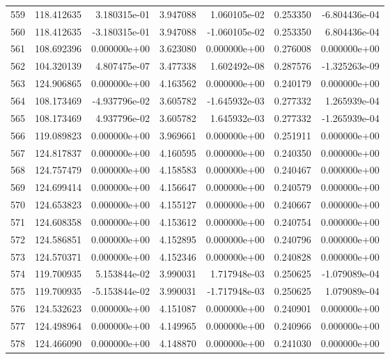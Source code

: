 \begin{tabular}{rrrrrrr}
 559 & 118.412635 &  3.180315e-01 &  3.947088 &  1.060105e-02 &    0.253350 & -6.804436e-04 \\
 560 & 118.412635 & -3.180315e-01 &  3.947088 & -1.060105e-02 &    0.253350 &  6.804436e-04 \\
 561 & 108.692396 &  0.000000e+00 &  3.623080 &  0.000000e+00 &    0.276008 &  0.000000e+00 \\
 562 & 104.320139 &  4.807475e-07 &  3.477338 &  1.602492e-08 &    0.287576 & -1.325263e-09 \\
 563 & 124.906865 &  0.000000e+00 &  4.163562 &  0.000000e+00 &    0.240179 &  0.000000e+00 \\
 564 & 108.173469 & -4.937796e-02 &  3.605782 & -1.645932e-03 &    0.277332 &  1.265939e-04 \\
 565 & 108.173469 &  4.937796e-02 &  3.605782 &  1.645932e-03 &    0.277332 & -1.265939e-04 \\
 566 & 119.089823 &  0.000000e+00 &  3.969661 &  0.000000e+00 &    0.251911 &  0.000000e+00 \\
 567 & 124.817837 &  0.000000e+00 &  4.160595 &  0.000000e+00 &    0.240350 &  0.000000e+00 \\
 568 & 124.757479 &  0.000000e+00 &  4.158583 &  0.000000e+00 &    0.240467 &  0.000000e+00 \\
 569 & 124.699414 &  0.000000e+00 &  4.156647 &  0.000000e+00 &    0.240579 &  0.000000e+00 \\
 570 & 124.653823 &  0.000000e+00 &  4.155127 &  0.000000e+00 &    0.240667 &  0.000000e+00 \\
 571 & 124.608358 &  0.000000e+00 &  4.153612 &  0.000000e+00 &    0.240754 &  0.000000e+00 \\
 572 & 124.586851 &  0.000000e+00 &  4.152895 &  0.000000e+00 &    0.240796 &  0.000000e+00 \\
 573 & 124.570371 &  0.000000e+00 &  4.152346 &  0.000000e+00 &    0.240828 &  0.000000e+00 \\
 574 & 119.700935 &  5.153844e-02 &  3.990031 &  1.717948e-03 &    0.250625 & -1.079089e-04 \\
 575 & 119.700935 & -5.153844e-02 &  3.990031 & -1.717948e-03 &    0.250625 &  1.079089e-04 \\
 576 & 124.532623 &  0.000000e+00 &  4.151087 &  0.000000e+00 &    0.240901 &  0.000000e+00 \\
 577 & 124.498964 &  0.000000e+00 &  4.149965 &  0.000000e+00 &    0.240966 &  0.000000e+00 \\
 578 & 124.466090 &  0.000000e+00 &  4.148870 &  0.000000e+00 &    0.241030 &  0.000000e+00 \\

\end{tabular}
